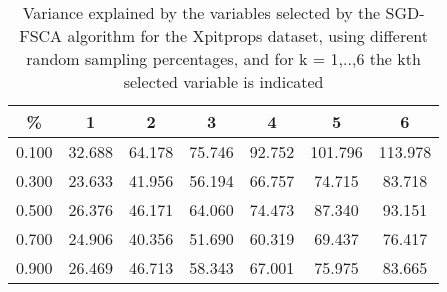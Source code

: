\begin{table}
	\begin{center}
		\begin{tabular}{c c c c c c c}
			\% & 1 & 2 & 3 & 4 & 5 & 6 \\
			\hline
			0.100 & 32.688 & 64.178 & 75.746 & 92.752 & 101.796 & 113.978 \\
			0.300 & 23.633 & 41.956 & 56.194 & 66.757 & 74.715 & 83.718 \\
			0.500 & 26.376 & 46.171 & 64.060 & 74.473 & 87.340 & 93.151 \\
			0.700 & 24.906 & 40.356 & 51.690 & 60.319 & 69.437 & 76.417 \\
			0.900 & 26.469 & 46.713 & 58.343 & 67.001 & 75.975 & 83.665 \\
		\end{tabular}
	\end{center}
	\caption{Variance explained by the variables selected by the SGD-FSCA algorithm for the Xpitprops dataset, using different random sampling percentages, and for k = 1,..,6 the kth selected variable is indicated}
\end{table}